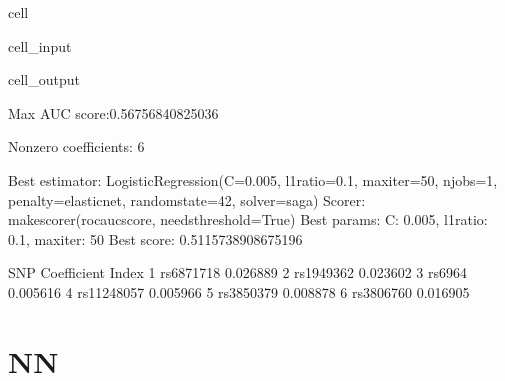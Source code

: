 \documentclass[letterpaper,10pt,english]{jupyterBook}
\begin{document}
\begin{sphinxuseclass}{cell}
\begin{sphinxVerbatimInput}
\begin{sphinxuseclass}{cell_input}
\end{sphinxuseclass}\end{sphinxVerbatimInput}
\begin{sphinxVerbatimOutput}

\begin{sphinxuseclass}{cell_output}
\begin{sphinxVerbatim}[commandchars=\\\{\}]
Max AUC score:0.56756840825036

Non\PYGZhy{}zero coefficients: 6

Best estimator: LogisticRegression(C=0.005, l1\PYGZus{}ratio=0.1, max\PYGZus{}iter=50, n\PYGZus{}jobs=\PYGZhy{}1,
                   penalty=\PYGZsq{}elasticnet\PYGZsq{}, random\PYGZus{}state=42, solver=\PYGZsq{}saga\PYGZsq{})
Scorer: make\PYGZus{}scorer(roc\PYGZus{}auc\PYGZus{}score, needs\PYGZus{}threshold=True)
Best params: \PYGZob{}\PYGZsq{}C\PYGZsq{}: 0.005, \PYGZsq{}l1\PYGZus{}ratio\PYGZsq{}: 0.1, \PYGZsq{}max\PYGZus{}iter\PYGZsq{}: 50\PYGZcb{}
Best score: 0.5115738908675196
\end{sphinxVerbatim}

\begin{sphinxVerbatim}[commandchars=\\\{\}]
              SNP Coefficient
Index                        
1       rs6871718   \PYGZhy{}0.026889
2       rs1949362   \PYGZhy{}0.023602
3          rs6964    0.005616
4      rs11248057    0.005966
5       rs3850379    0.008878
6       rs3806760    0.016905
\end{sphinxVerbatim}

\end{sphinxuseclass}\end{sphinxVerbatimOutput}

\end{sphinxuseclass}

\section{NN}
\label{\detokenize{Cooper:nn}}
\end{document}
